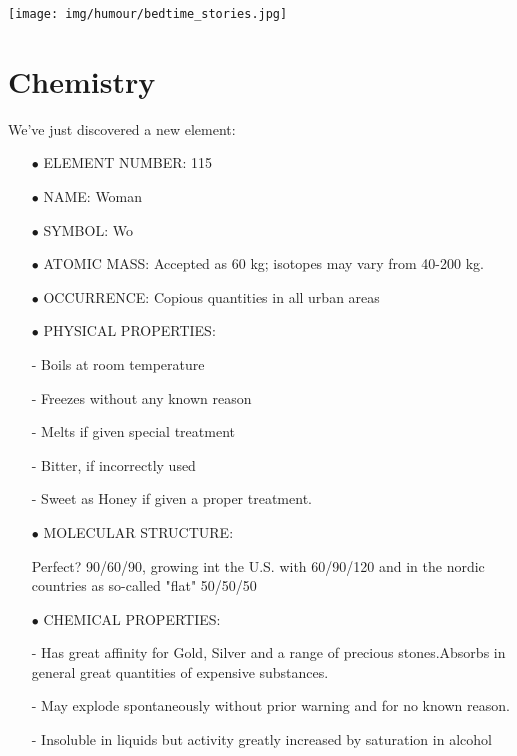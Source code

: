	\begin{center}\underline{\hspace{5 cm}}\end{center}
	\begin{center}
	\texttt{[image: img/humour/bedtime\_stories.jpg]}
	\end{center}
		
	\pagebreak
	\section{Chemistry}

We've just discovered a new element:

\begin{itemize}
	\item[$\bullet$] ELEMENT NUMBER: 115

	\item[$\bullet$]NAME: Woman

	\item[$\bullet$] SYMBOL: Wo

	\item[$\bullet$] ATOMIC MASS: Accepted as 60 kg; isotopes may vary from 40-200 kg.

	\item[$\bullet$] OCCURRENCE: Copious quantities in all urban areas

	\item[$\bullet$] PHYSICAL PROPERTIES:

- Boils at room temperature

- Freezes without any known reason

- Melts if given special treatment

- Bitter, if incorrectly used

- Sweet as Honey if given a proper treatment.

	\item[$\bullet$] MOLECULAR STRUCTURE:

Perfect? 90/60/90, growing int the U.S. with 60/90/120 and in the nordic countries as so-called "flat" 50/50/50

	\item[$\bullet$] CHEMICAL PROPERTIES:

- Has great affinity for Gold, Silver and a range of precious stones.Absorbs in general great quantities of expensive substances.

- May explode spontaneously without prior warning and for no known reason.

- Insoluble in liquids but activity greatly increased by saturation in alcohol


\end{itemize}
